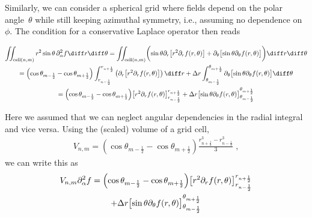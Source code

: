 \documentclass[
	superscriptaddress,
	twocolumn,
	aps, pre
]{revtex4-1}
\newcommand{\dr}{\Delta r}
\begin{document}
Similarly, we can consider a spherical grid where fields depend on the polar angle~$\theta$ while still keeping azimuthal symmetry, i.e., assuming no dependence on $\phi$.
The condition for a conservative Laplace operator then reads
\begin{widetext}
\begin{multline}
	\iint_{\text{cell}(n, m)} r^2 \sin\theta \, \partial_\alpha^2 f  \diff r \diff \theta
=
	\iint_{\text{cell}(n, m)} \biggl(
		\sin\theta  \partial_r\bigl[r^2 \partial_r f(r, \theta)\bigr]
		+ \partial_\theta \bigl[ \sin\theta \partial_\theta  f(r, \theta)\bigr]
	\biggr)\diff r \diff \theta
\\=
	\Bigl(\cos\theta_{m-\frac12} - \cos\theta_{m + \frac12}\Bigr)
		\int_{r_{n - \frac12}}^{r_{n + \frac12}}\left(
			 \partial_r\bigl[r^2 \partial_r f(r, \theta)\bigr]
		\right)  \diff r
	+ \Delta r
		\int_{\theta_{m - \frac12}}^{\theta_{m + \frac12}}
			 \partial_\theta \bigl[ \sin\theta \partial_\theta  f(r, \theta)\bigr]	 \diff\theta
\\=
	\Bigl(\cos\theta_{m-\frac12} - \cos\theta_{m + \frac12}\Bigr)
			\bigl[r^2 \partial_r f(r, \theta)\bigr]_{r_{n - \frac12}}^{r_{n + \frac12}}
	+  \Delta r
		\bigl[ \sin\theta \partial_\theta  f(r, \theta)\bigr]_{\theta_{m - \frac12}}^{\theta_{m + \frac12}}
\end{multline}
\end{widetext}
Here we assumed that we can neglect angular dependencies in the radial integral and vice versa.
Using the (scaled) volume of a grid cell,
\begin{align}
	V_{n,m} =
		\left(\cos\theta_{m-\frac12} - \cos\theta_{m + \frac12}\right)
		\frac{r_{n + \frac12}^3 - r_{n - \frac12}^3}{3}
	\;,
\end{align}
we can write this as
\begin{multline}
	V_{n,m} \partial_\alpha^2 f
=\Bigl(\cos\theta_{m-\frac12} - \cos\theta_{m + \frac12}\Bigr)
			\bigl[r^2 \partial_r f(r, \theta)\bigr]_{r_{n - \frac12}}^{r_{n + \frac12}}
\\
	+  \Delta r
		\bigl[ \sin\theta \partial_\theta  f(r, \theta)\bigr]_{\theta_{m - \frac12}}^{\theta_{m + \frac12}}
\end{multline}
\end{document}
